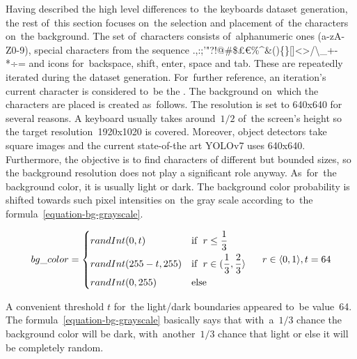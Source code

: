Having described the high level differences to~the keyboards dataset generation, the rest of~this section focuses on~the selection and placement of~the characters on~the background. The set of~characters consists of~alphanumeric ones (a-zA-Z0-9), special characters from the sequence .,:;'"?!@\#\$£€\%\^{ }\&()\{\}[]<>/\textbackslash\_+-*÷= and icons for~backspace, shift, enter, space and tab. These are repeatedly iterated during the dataset generation. For~further reference, an iteration's current character is considered to~be the . The background on~which the characters are placed is created as~follows. The resolution is set to 640x640 for several reasons. A keyboard usually takes around~\(1/2\) of~the screen's height so the target resolution~1920x1020 is covered. Moreover, object detectors take square images and the current state-of-the art YOLOv7 uses 640x640. Furthermore, the objective is to find characters of different but bounded sizes, so the background resolution does not play a significant role anyway. As~for~the background color, it is usually light or dark. The background color probability is shifted towards such pixel intensities on~the gray scale according to~the formula~\ref{equation-bg-grayscale}.

\begin{equation}
  \label{equation-bg-grayscale}
  bg\_color = \begin{dcases}
 randInt(0, t) & \text{if}\hspace{6pt}r \leq \frac{1}{3}
 \\
 randInt(255 - t, 255) & \text{if}\hspace{6pt}r \in (\frac{1}{3}, \frac{2}{3}\rangle
 \\
 randInt(0, 255) & \text{else}
 \end{dcases}
 \hspace{0.5cm} r \in \langle0, 1\rangle, t = 64
\end{equation}

A convenient threshold \(t\) for~the light/dark boundaries appeared to~be value~64. The formula~\ref{equation-bg-grayscale} basically says that with~a~\(1/3\) chance the background color will be dark, with~another~\(1/3\) chance that light or else it will be completely random.

